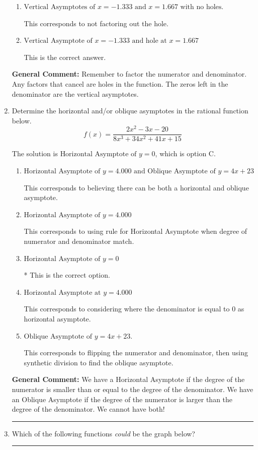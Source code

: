 \documentclass{extbook}[14pt]
\newcommand{\litem}[1]{\item #1

\rule{\textwidth}{0.4pt}}
\begin{document}
\begin{enumerate}
{\begin{enumerate}[label=\Alph*.]
This corresponds to setting the numerator equal to 0.
\item \( \text{Vertical Asymptotes of } x = -1.333 \text{ and } x = 1.667 \text{ with no holes.} \)

This corresponds to not factoring out the hole.
\item \( \text{Vertical Asymptote of } x = -1.333 \text{ and hole at } x = 1.667 \)

This is the correct answer.
\end{enumerate}

\textbf{General Comment:} Remember to factor the numerator and denominator. Any factors that cancel are holes in the function. The zeros left in the denominator are the vertical asymptotes.
}
\litem{
Determine the horizontal and/or oblique asymptotes in the rational function below.
\[ f(x) = \frac{2x^{2} -3 x -20}{8x^{3} +34 x^{2} +41 x + 15} \]

The solution is \( \text{Horizontal Asymptote of } y = 0 \), which is option C.\begin{enumerate}[label=\Alph*.]
\item \( \text{Horizontal Asymptote of } y = 4.000 \text{ and Oblique Asymptote of } y = 4x + 23 \)

This corresponds to believing there can be both a horizontal and oblique asymptote.
\item \( \text{Horizontal Asymptote of } y = 4.000  \)

This corresponds to using rule for Horizontal Asymptote when degree of numerator and denominator match.
\item \( \text{Horizontal Asymptote of } y = 0 \)

* This is the correct option.
\item \( \text{Horizontal Asymptote at } y = 4.000 \)

This corresponds to considering where the denominator is equal to 0 as horizontal asymptote.
\item \( \text{Oblique Asymptote of } y = 4x + 23. \)

This corresponds to flipping the numerator and denominator, then using synthetic division to find the oblique asymptote.
\end{enumerate}

\textbf{General Comment:} We have a Horizontal Asymptote if the degree of the numerator is smaller than or equal to the degree of the denominator. We have an Oblique Asymptote if the degree of the numerator is larger than the degree of the denominator. We cannot have both!
}
\litem{
Which of the following functions \textit{could} be the graph below?

}
\end{enumerate}
\end{document}

